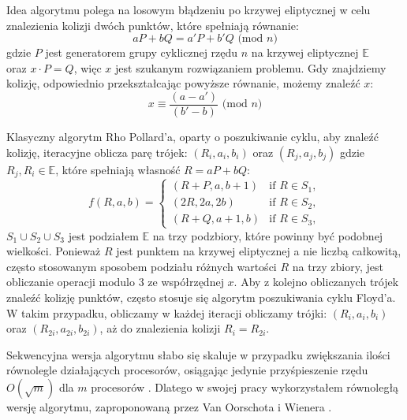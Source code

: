 Idea algorytmu polega na losowym błądzeniu po krzywej eliptycznej
w celu znalezienia kolizji dwóch punktów, które spełniają równanie:
$$
    a P + b Q = a' P + b' Q \textrm{ (mod } n)
$$
gdzie $P$ jest generatorem grupy cyklicznej rzędu $n$ na krzywej eliptycznej $\mathbb{E}$ \\
oraz $x \cdot P = Q$, więc $x$ jest szukanym rozwiązaniem problemu.
Gdy znajdziemy kolizję, odpowiednio przekształcając powyższe równanie, możemy znaleźć
$x$:
$$
    x \equiv \frac{(a-a')}{(b'-b)} \textrm{ (mod } n)
$$


Klasyczny algorytm Rho Pollard'a, oparty o poszukiwanie cyklu,
aby znaleźć kolizję, iteracyjne oblicza parę trójek:
$(R_i,a_i,b_i)$ oraz $(R_j,a_j,b_j)$ gdzie $R_j, R_i \in \mathbb{E}$, które spełniają
własność $R = a P + b Q$:
$$
    f(R,a,b) =
    \begin{cases}
        (R + P,a,b+1)     & \text{if } R \in S_1, \\
        (2R,2a, 2b)       & \text{if } R \in S_2, \\
        (R + Q, a + 1, b) & \text{if } R \in S_3,
    \end{cases}
$$
$S_1 \cup S_2 \cup S_3$ jest podziałem $\mathbb{E}$ na trzy podzbiory, które powinny być podobnej wielkości.
Ponieważ $R$ jest punktem na krzywej eliptycznej a nie liczbą całkowitą, często stosowanym sposobem
podziału różnych wartości $R$ na trzy zbiory, jest obliczanie operacji modulo $3$ ze współrzędnej $x$.
Aby z kolejno obliczanych trójek znaleźć kolizję punktów, często stosuje się algorytm poszukiwania cyklu Floyd'a.
W takim przypadku, obliczamy w każdej iteracji obliczamy trójki: $(R_i, a_i, b_i)$ oraz $(R_{2i}, a_{2i}, b_{2i})$, aż do znalezienia
kolizji $R_i = R_{2i}$.

\par
Sekwencyjna wersja algorytmu słabo się skaluje w przypadku zwiększania ilości równolegle działających procesorów,
osiągając jedynie przyśpieszenie rzędu $O(\sqrt{m})$ dla $m$ procesorów \cite{Oorschot}.
Dlatego w swojej pracy wykorzystałem równoległą wersję algorytmu, zaproponowaną przez Van Oorschota i Wienera \cite{Oorschot}.

